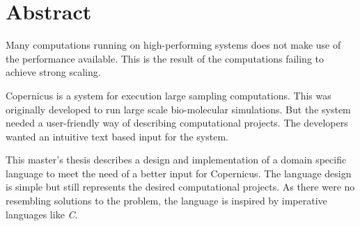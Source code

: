 \begingroup
\let\clearpage\relax
\let\cleardoublepage\relax
\let\cleardoublepage\relax

\chapter*{Abstract}

Many computations running on high-performing systems does not make use
of the performance available. This is the result of the computations
failing to achieve strong scaling.

Copernicus is a system for execution large sampling computations. This
was originally developed to run large scale bio-molecular
simulations. But the system needed a user-friendly way of describing
computational projects. The developers wanted an intuitive text based
input for the system.

This master's thesis describes a design and implementation of a domain
specific language to meet the need of a better input for
Copernicus. The language design is simple but still represents the
desired computational projects. As there were no resembling solutions
to the problem, the language is inspired by imperative languages
like \emph{C}.


\endgroup			

\vfill
